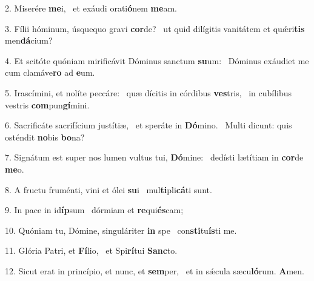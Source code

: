 2. Miserére \textbf{me}i, \ast\  et exáudi orati\textbf{ó}nem \textbf{me}am.\

3. Fílii hóminum, úsquequo gravi \textbf{cor}de? \ast\  ut quid dilígitis vanitátem et quǽri\textbf{tis} men\textbf{dá}cium?\

4. Et scitóte quóniam mirificávit Dóminus sanctum \textbf{su}um: \ast\  Dóminus exáudiet me cum clamáve\textbf{ro} ad \textbf{e}um.\

5. Irascímini, et nolíte peccáre: \dag\  quæ dícitis in córdibus \textbf{ves}tris, \ast\  in cubílibus vestris \textbf{com}pun\textbf{gí}mini.\

6. Sacrificáte sacrifícium justítiæ, \dag\  et speráte in \textbf{Dó}mino. \ast\  Multi dicunt: quis osténdit \textbf{no}bis \textbf{bo}na?\

7. Signátum est super nos lumen vultus tui, \textbf{Dó}mine: \ast\  dedísti lætítiam in \textbf{cor}de \textbf{me}o.\

8. A fructu fruménti, vini et ólei \textbf{su}i \ast\  mul\textbf{ti}pli\textbf{cá}ti sunt.\

9. In pace in id\textbf{íp}sum \ast\  dórmiam et \textbf{re}qui\textbf{és}cam;\

10. Quóniam tu, Dómine, singuláriter \textbf{in} spe \ast\  con\textbf{sti}tu\textbf{ís}ti me.\

11. Glória Patri, et \textbf{Fí}lio, \ast\  et Spi\textbf{rí}tui \textbf{Sanc}to.\

12. Sicut erat in princípio, et nunc, et \textbf{sem}per, \ast\  et in sǽcula sæcu\textbf{ló}rum. \textbf{A}men.\

